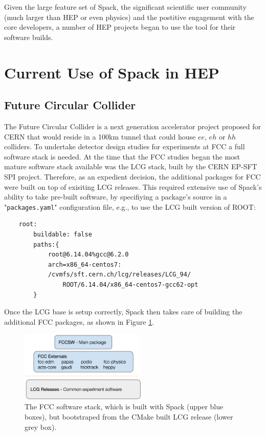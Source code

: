 \documentclass{webofc}
\begin{document}
Given the large feature set of Spack, the significant scientific user community
(much larger than HEP or even physics) and the postitive engagement with the
core developers, a number of HEP projects began to use the tool for their
software builds.

\section{Current Use of Spack in HEP}
\label{hep-spack-use}

\subsection{Future Circular Collider}
\label{fcc}

The Future Circular Collider\cite{Benedikt:2653673} is a next generation
accelerator project proposed for CERN that would reside in a 100km tunnel that
could house $ee$, $eh$ or $hh$ colliders. To undertake detector design studies
for experiments at FCC a full software stack is needed. At the time that the FCC
studies began the most mature software stack available was the LCG stack, built
by the CERN EP-SFT SPI project\cite{LCGStack}. Therefore, as an expedient
decision, the additional packages for FCC were built on top of exisiting
LCG releases. This required extensive use of Spack's ability to take pre-built
software, by specifiying a package's source in a "\texttt{packages.yaml}" configuration file, e.g., to
use the LCG built version of ROOT:

\begin{verbatim}
    root:
        buildable: false
        paths:{
            root@6.14.04%gcc@6.2.0
            arch=x86_64-centos7:
            /cvmfs/sft.cern.ch/lcg/releases/LCG_94/
                ROOT/6.14.04/x86_64-centos7-gcc62-opt
        }
\end{verbatim}

Once the LCG base is setup correctly, Spack then takes care of building the
additional FCC packages, as shown in Figure \ref{fig:fcc-stack}.

\begin{figure}[h]
    \centering
    \includegraphics[width=6cm]{fcc-stack.png}
    \caption{The FCC software stack, which is built with Spack (upper blue boxes),
    but bootstraped from the CMake built LCG release (lower grey box).}
    \label{fig:fcc-stack}
\end{figure}
\end{document}
